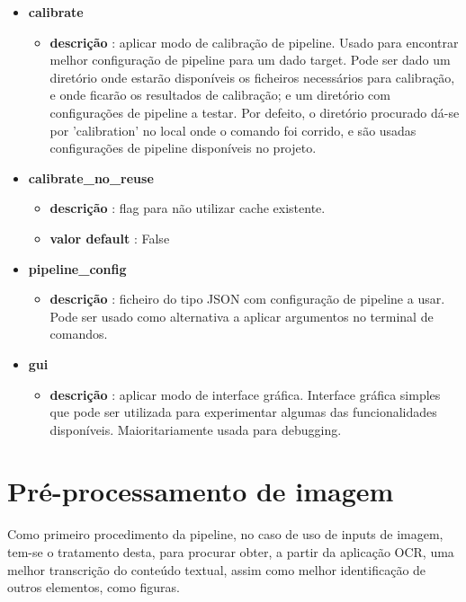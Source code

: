\begin{itemize}
	\item \textbf{calibrate}
		\begin{itemize}\setlength\itemsep{-0.5em}
			\item \textbf{descrição} : aplicar modo de calibração de pipeline. Usado para encontrar melhor configuração de pipeline para um dado target. Pode ser dado um diretório onde estarão disponíveis os ficheiros necessários para calibração, e onde ficarão os resultados de calibração; e um diretório com configurações de pipeline a testar. Por defeito, o diretório procurado dá-se por 'calibration' no local onde o comando foi corrido, e são usadas configurações de pipeline disponíveis no projeto. 
		\end{itemize}
	
	\item \textbf{calibrate\_no\_reuse}
		\begin{itemize}\setlength\itemsep{-0.5em}
			\item \textbf{descrição} : flag para não utilizar cache existente.
			\item \textbf{valor default} : False
		\end{itemize}
	
	\item \textbf{pipeline\_config}
		\begin{itemize}\setlength\itemsep{-0.5em}
			\item \textbf{descrição} : ficheiro do tipo JSON com configuração de pipeline a usar. Pode ser usado como alternativa a aplicar argumentos no terminal de comandos.
		\end{itemize}
		
	\item \textbf{gui}
		\begin{itemize}\setlength\itemsep{-0.5em}
			\item \textbf{descrição} : aplicar modo de interface gráfica. Interface gráfica simples que pode ser utilizada para experimentar algumas das funcionalidades disponíveis. Maioritariamente usada para debugging.
		\end{itemize}
\end{itemize}


\section{Pré-processamento de imagem}

Como primeiro procedimento da pipeline, no caso de uso de inputs de imagem, tem-se o tratamento desta, para procurar obter, a partir da aplicação OCR, uma melhor transcrição do conteúdo textual, assim como melhor identificação de outros elementos, como figuras.

